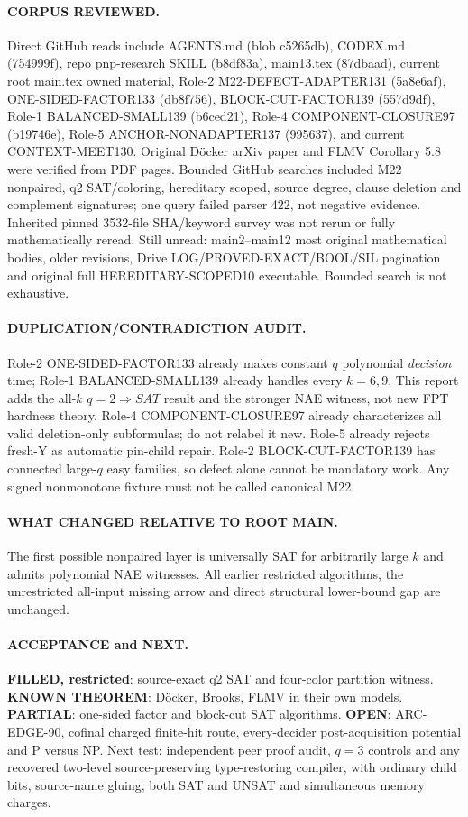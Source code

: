 \documentclass[11pt]{article}
\begin{document}
\paragraph{CORPUS REVIEWED.}
Direct GitHub reads include
AGENTS.md (blob c5265db),
CODEX.md (754999f), repo
pnp-research SKILL (b8df83a),
main13.tex (87dbaad), current
root main.tex owned material,
Role-2 M22-DEFECT-ADAPTER131
(5a8e6af), ONE-SIDED-FACTOR133
(db8f756), BLOCK-CUT-FACTOR139
(557d9df), Role-1
BALANCED-SMALL139 (b6ced21),
Role-4 COMPONENT-CLOSURE97
(b19746e), Role-5
ANCHOR-NONADAPTER137 (995637),
and current CONTEXT-MEET130.
Original D\"ocker arXiv paper
and FLMV Corollary 5.8 were
verified from PDF pages.
Bounded GitHub searches included
M22 nonpaired, q2 SAT/coloring,
hereditary scoped, source
degree, clause deletion and
complement signatures; one query
failed parser 422, not negative
evidence. Inherited pinned
3532-file SHA/keyword survey
was not rerun or fully
mathematically reread.
Still unread: main2--main12
most original mathematical
bodies, older revisions,
Drive LOG/PROVED-EXACT/BOOL/SIL
pagination and original full
HEREDITARY-SCOPED10 executable.
Bounded search is not exhaustive.

\paragraph{DUPLICATION/CONTRADICTION AUDIT.}
Role-2 ONE-SIDED-FACTOR133
already makes constant $q$
polynomial \emph{decision} time;
Role-1 BALANCED-SMALL139
already handles every $k=6,9$.
This report adds the all-$k$
$q=2\Rightarrow SAT$ result
and the stronger NAE witness,
not new FPT hardness theory.
Role-4 COMPONENT-CLOSURE97
already characterizes all
valid deletion-only subformulas;
do not relabel it new.
Role-5 already rejects fresh-Y
as automatic pin-child repair.
Role-2 BLOCK-CUT-FACTOR139
has connected large-$q$ easy
families, so defect alone
cannot be mandatory work.
Any signed nonmonotone fixture
must not be called canonical M22.

\paragraph{WHAT CHANGED RELATIVE TO ROOT MAIN.}
The first possible nonpaired layer
is universally SAT for arbitrarily
large $k$ and admits polynomial
NAE witnesses. All earlier
restricted algorithms, the
unrestricted all-input missing
arrow and direct structural
lower-bound gap are unchanged.

\paragraph{ACCEPTANCE and NEXT.}
\textbf{FILLED, restricted}:
source-exact q2 SAT and
four-color partition witness.
\textbf{KNOWN THEOREM}: D\"ocker,
Brooks, FLMV in their own
models. \textbf{PARTIAL}:
one-sided factor and block-cut
SAT algorithms. \textbf{OPEN}:
ARC-EDGE-90, cofinal charged
finite-hit route, every-decider
post-acquisition potential and
P versus NP. Next test:
independent peer proof audit,
$q=3$ controls and any recovered
two-level source-preserving
type-restoring compiler, with
ordinary child bits, source-name
gluing, both SAT and UNSAT
and simultaneous memory charges.
\end{document}
